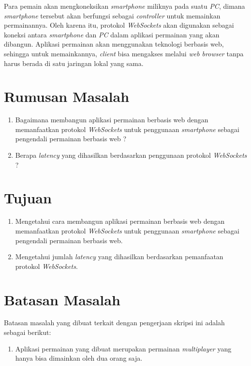 Para pemain akan mengkoneksikan \textit{smartphone} miliknya pada suatu \textit{PC}, dimana \textit{smartphone} tersebut akan berfungsi sebagai \textit{controller} untuk memainkan permainannya. Oleh karena itu, protokol \textit{WebSockets} akan digunakan sebagai koneksi antara \textit{smartphone} dan \textit{PC} dalam aplikasi permainan yang akan dibangun. Aplikasi permainan akan menggunakan teknologi berbasis web, sehingga untuk memainkannya, \textit{client} bisa mengakses melalui \textit{web browser} tanpa harus berada di satu jaringan lokal yang sama.

\section{Rumusan Masalah}
\label{sec:rumusan}

\begin{enumerate}
	\item Bagaimana membangun aplikasi permainan berbasis web dengan memanfaatkan protokol \textit{WebSockets} untuk penggunaan \textit{smartphone} sebagai pengendali permainan berbasis web ?
	\item Berapa \textit{latency} yang dihasilkan berdasarkan penggunaan protokol \textit{WebSockets} ? 
\end{enumerate}


\section{Tujuan}
\label{sec:tujuan}
\begin{enumerate}
	\item Mengetahui cara membangun aplikasi permainan berbasis web dengan memanfaatkan protokol \textit{WebSockets} untuk penggunaan \textit{smartphone} sebagai pengendali permainan berbasis web.
	\item Mengetahui jumlah \textit{latency} yang dihasilkan berdasarkan pemanfaatan protokol \textit{WebSockets}.
\end{enumerate}


\section{Batasan Masalah}
\label{sec:batasan}

Batasan masalah yang dibuat terkait dengan pengerjaan skripsi ini adalah sebagai berikut:

\begin{enumerate}
	\item Aplikasi permainan yang dibuat merupakan permainan \textit{multiplayer} yang hanya bisa dimainkan oleh dua orang saja.
\end{enumerate}


